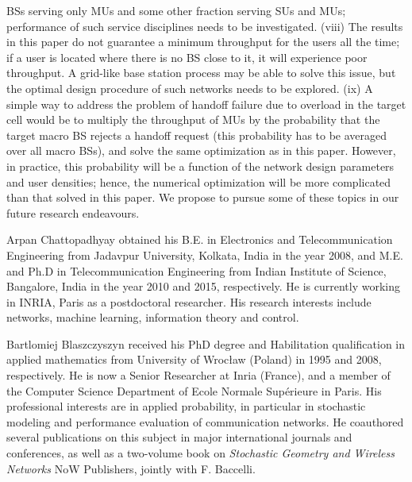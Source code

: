 \documentclass[10pt,journal]{IEEEtran}
\begin{document}
BSs serving only MUs and some other fraction serving SUs and MUs; performance of such 
service disciplines needs to be investigated. (viii) The results in this paper 
do not guarantee a minimum throughput for the users all the time; if a user is located where there is no BS close to it, it will experience poor 
throughput. A grid-like base station process may be able to solve this issue, but the optimal 
design procedure of such networks needs to be explored. (ix) A simple way to address the problem of handoff failure due 
to overload in the target cell would be to multiply the throughput of MUs  by the probability that the target 
macro BS rejects 
a handoff request (this probability has to be averaged over all macro BSs), 
and solve the same optimization  as in this paper. However, in practice, this probability will 
be a function of the network design parameters and user densities; hence, the numerical optimization will be more complicated 
than that solved in this paper. We propose 
to pursue some of these topics in our future research endeavours.


 





{\small


}



  \vspace{-10mm}



\begin{IEEEbiography}{Arpan 
Chattopadhyay} obtained his B.E. in Electronics and Telecommunication Engineering from Jadavpur University, 
Kolkata, India in the year 2008, and M.E. and Ph.D in Telecommunication Engineering from Indian Institute of Science, 
Bangalore, India in the year 2010 and 2015, respectively. He is currently working in INRIA, Paris as a postdoctoral researcher. 
His research interests include  networks, machine learning, information theory and control.
    \end{IEEEbiography}

    
        \vspace{-10mm}


\begin{IEEEbiography}
{Bartlomiej Blaszczyszyn} received his PhD degree and Habilitation qualification
in applied mathematics from University of Wrocław (Poland) in 1995
and 2008, respectively. He is now a Senior Researcher at Inria (France), and
a member of the Computer Science Department of Ecole Normale Supérieure
in Paris. His professional interests are in applied probability, in particular in
stochastic modeling and performance evaluation of communication networks.
He coauthored several publications on this subject in major international
journals and conferences, as well as a two-volume book on {\em Stochastic
Geometry and Wireless Networks} NoW Publishers, jointly with F. Baccelli.
   
    \end{IEEEbiography}
    
\end{document}
